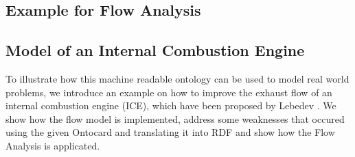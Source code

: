 \documentclass[a4paper,11pt]{article}
\begin{document}
\begin{itemize}
    \section{Example for Flow Analysis}
    \subsection{Model of an Internal Combustion Engine}

    To illustrate how this machine readable ontology can be used to model real
    world problems, we introduce an example on how to improve the exhaust
    flow of an internal combustion engine (ICE), which have been proposed by 
    Lebedev \cite{Lebedyev2015}. We show how the flow model is implemented,
    address some weaknesses that occured using the given Ontocard and 
    translating it into RDF and show how the Flow Analysis is applicated.


\end{itemize}
\end{document}

